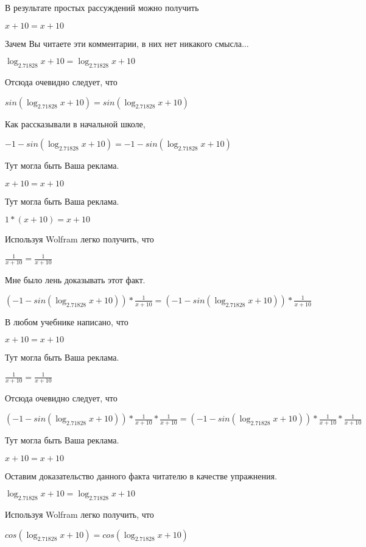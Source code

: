 \documentclass[12pt,a4paper,fleqn]{article}
\theoremstyle{definition}
\begin{document}
В результате простых рассуждений можно получить

$ x  +  10  =  x  +  10 $

Зачем Вы читаете эти комментарии, в них нет никакого смысла...

$\log_{ 2.71828 }{ x  +  10 } = \log_{ 2.71828 }{ x  +  10 }$

Отсюда очевидно следует, что

$sin(\log_{ 2.71828 }{ x  +  10 }) = sin(\log_{ 2.71828 }{ x  +  10 })$

Как рассказывали в начальной школе,

$ -1  - sin(\log_{ 2.71828 }{ x  +  10 }) =  -1  - sin(\log_{ 2.71828 }{ x  +  10 })$

Тут могла быть Ваша реклама.

$ x  +  10  =  x  +  10 $

Тут могла быть Ваша реклама.

$ 1  * ( x  +  10 ) =  x  +  10 $

Используя Wolfram легко получить, что

$\frac{ 1 }{ x  +  10 }
 = \frac{ 1 }{ x  +  10 }
$

Мне было лень доказывать этот факт.

$( -1  - sin(\log_{ 2.71828 }{ x  +  10 })) * \frac{ 1 }{ x  +  10 }
 = ( -1  - sin(\log_{ 2.71828 }{ x  +  10 })) * \frac{ 1 }{ x  +  10 }
$

В любом учебнике написано, что

$ x  +  10  =  x  +  10 $

Тут могла быть Ваша реклама.

$\frac{ 1 }{ x  +  10 }
 = \frac{ 1 }{ x  +  10 }
$

Отсюда очевидно следует, что

$( -1  - sin(\log_{ 2.71828 }{ x  +  10 })) * \frac{ 1 }{ x  +  10 }
 * \frac{ 1 }{ x  +  10 }
 = ( -1  - sin(\log_{ 2.71828 }{ x  +  10 })) * \frac{ 1 }{ x  +  10 }
 * \frac{ 1 }{ x  +  10 }
$

Тут могла быть Ваша реклама.

$ x  +  10  =  x  +  10 $

Оставим доказательство данного факта читателю в качестве упражнения.

$\log_{ 2.71828 }{ x  +  10 } = \log_{ 2.71828 }{ x  +  10 }$

Используя Wolfram легко получить, что

$cos(\log_{ 2.71828 }{ x  +  10 }) = cos(\log_{ 2.71828 }{ x  +  10 })$
\end{document}
